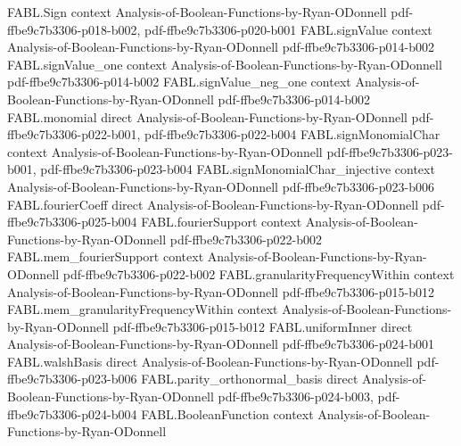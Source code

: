 \begin{theorem}
\label{FABL.totalStableInfluence_eq_sum_card_mul_rho_pow_mul_sq_fourierCoeff}
\leanok
{}
\proofstep
  {FABL.Sign}
  {context}
  {Analysis-of-Boolean-Functions-by-Ryan-ODonnell}
  {pdf-ffbe9c7b3306-p018-b002,
    pdf-ffbe9c7b3306-p020-b001}
\proofstep
  {FABL.signValue}
  {context}
  {Analysis-of-Boolean-Functions-by-Ryan-ODonnell}
  {pdf-ffbe9c7b3306-p014-b002}
\proofstep
  {FABL.signValue_one}
  {context}
  {Analysis-of-Boolean-Functions-by-Ryan-ODonnell}
  {pdf-ffbe9c7b3306-p014-b002}
\proofstep
  {FABL.signValue_neg_one}
  {context}
  {Analysis-of-Boolean-Functions-by-Ryan-ODonnell}
  {pdf-ffbe9c7b3306-p014-b002}
\proofstep
  {FABL.monomial}
  {direct}
  {Analysis-of-Boolean-Functions-by-Ryan-ODonnell}
  {pdf-ffbe9c7b3306-p022-b001,
    pdf-ffbe9c7b3306-p022-b004}
\proofstep
  {FABL.signMonomialChar}
  {context}
  {Analysis-of-Boolean-Functions-by-Ryan-ODonnell}
  {pdf-ffbe9c7b3306-p023-b001,
    pdf-ffbe9c7b3306-p023-b004}
\proofstep
  {FABL.signMonomialChar_injective}
  {context}
  {Analysis-of-Boolean-Functions-by-Ryan-ODonnell}
  {pdf-ffbe9c7b3306-p023-b006}
\proofstep
  {FABL.fourierCoeff}
  {direct}
  {Analysis-of-Boolean-Functions-by-Ryan-ODonnell}
  {pdf-ffbe9c7b3306-p025-b004}
\proofstep
  {FABL.fourierSupport}
  {context}
  {Analysis-of-Boolean-Functions-by-Ryan-ODonnell}
  {pdf-ffbe9c7b3306-p022-b002}
\proofstep
  {FABL.mem_fourierSupport}
  {context}
  {Analysis-of-Boolean-Functions-by-Ryan-ODonnell}
  {pdf-ffbe9c7b3306-p022-b002}
\proofstep
  {FABL.granularityFrequencyWithin}
  {context}
  {Analysis-of-Boolean-Functions-by-Ryan-ODonnell}
  {pdf-ffbe9c7b3306-p015-b012}
\proofstep
  {FABL.mem_granularityFrequencyWithin}
  {context}
  {Analysis-of-Boolean-Functions-by-Ryan-ODonnell}
  {pdf-ffbe9c7b3306-p015-b012}
\proofstep
  {FABL.uniformInner}
  {direct}
  {Analysis-of-Boolean-Functions-by-Ryan-ODonnell}
  {pdf-ffbe9c7b3306-p024-b001}
\proofstep
  {FABL.walshBasis}
  {direct}
  {Analysis-of-Boolean-Functions-by-Ryan-ODonnell}
  {pdf-ffbe9c7b3306-p023-b006}
\proofstep
  {FABL.parity_orthonormal_basis}
  {direct}
  {Analysis-of-Boolean-Functions-by-Ryan-ODonnell}
  {pdf-ffbe9c7b3306-p024-b003,
    pdf-ffbe9c7b3306-p024-b004}
\proofstep
  {FABL.BooleanFunction}
  {context}
  {Analysis-of-Boolean-Functions-by-Ryan-ODonnell}

\end{theorem}
